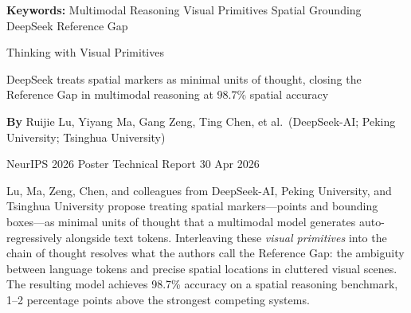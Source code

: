 \documentclass[10pt,twocolumn]{article}
\begin{document}
\setlength{\parindent}{0pt}
\setlength{\parskip}{4pt}

{\small\color{keywordgray}\textbf{Keywords:}
  Multimodal Reasoning \textbullet{} Visual Primitives \textbullet{} Spatial Grounding \textbullet{} DeepSeek \textbullet{} Reference Gap}\par\vspace{4pt}

{\LARGE\bfseries\raggedright Thinking with Visual Primitives}\par\vspace{4pt}
{\large\itshape\raggedright DeepSeek treats spatial markers as minimal units of thought, closing the Reference Gap in multimodal reasoning at 98.7\% spatial accuracy}\par\vspace{6pt}
{\small\textbf{By} Ruijie Lu, Yiyang Ma, Gang Zeng, Ting Chen, et al.\ (DeepSeek-AI; Peking University; Tsinghua University)}\par\vspace{2pt}
{\small\color{keywordgray}NeurIPS 2026 Poster \textbullet{} Technical Report 30 Apr 2026}
\par\vspace{2pt}\noindent{\color{rulered}\rule{\columnwidth}{0.6pt}}\vspace{6pt}

Lu, Ma, Zeng, Chen, and colleagues from DeepSeek-AI, Peking University, and Tsinghua University propose treating spatial markers---points and bounding boxes---as minimal units of thought that a multimodal model generates auto-regressively alongside text tokens.
Interleaving these \emph{visual primitives} into the chain of thought resolves what the authors call the Reference Gap: the ambiguity between language tokens and precise spatial locations in cluttered visual scenes.
The resulting model achieves 98.7\% accuracy on a spatial reasoning benchmark, 1--2 percentage points above the strongest competing systems.
\end{document}
